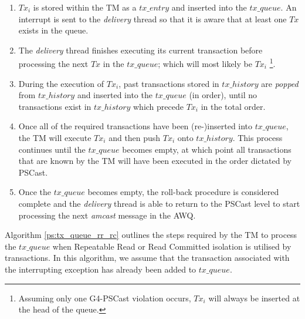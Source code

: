     \begin{enumerate}
        \item    $Tx_i$ is stored within the TM as a $tx\_entry$ and inserted into the $tx\_queue$.  An interrupt is sent to the \emph{delivery} thread so that it is aware that at least one $Tx$ exists in the queue.  
        
        \item    The \emph{delivery} thread finishes executing its current transaction before processing the next $Tx$ in the $tx\_queue$; which will most likely be $Tx_i$ \footnote{Assuming only one G4-PSCast violation occurs, $Tx_i$ will always be inserted at the head of the queue.}.
        
        \item    During the execution of $Tx_i$, past transactions stored in $tx\_history$ are \emph{popped} from $tx\_history$ and inserted into the $tx\_queue$ (in order), until no transactions exist in $tx\_history$ which precede $Tx_i$ in the total order.
        
        \item    Once all of the required transactions have been (re-)inserted into $tx\_queue$, the TM will execute $Tx_i$ and then push $Tx_i$ onto $tx\_history$.  This process continues until the $tx\_queue$ becomes empty, at which point all transactions that are known by the TM will have been executed in the order dictated by \textsf{PSCast}.  
        
        \item    Once the $tx\_queue$ becomes empty, the roll-back procedure is considered complete and the \emph{delivery} thread is able to return to the \textsf{PSCast} level to start processing the next \emph{amcast} message in the AWQ.  
    \end{enumerate}        
    
    Algorithm \ref{ps:tx_queue_rr_rc} outlines the steps required by the TM to process the $tx\_queue$ when Repeatable Read or Read Committed isolation is utilised by transactions.  In this algorithm, we assume that the transaction associated with the interrupting exception has already been added to $tx\_queue$.  
    
